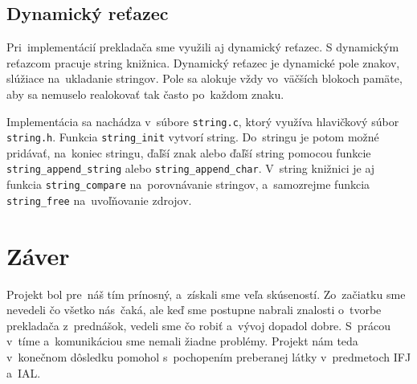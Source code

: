 \documentclass[a4paper, 12pt]{article}[25.11.2020]
\begin{document}
    \subsection{Dynamický reťazec}
        \par Pri~implementácií prekladača sme využili aj dynamický reťazec. S dynamickým
        reťazcom pracuje string knižnica. Dynamický reťazec je dynamické pole znakov, slúžiace
        na~ukladanie stringov. Pole sa alokuje vždy vo~väčších blokoch pamäte, aby sa nemuselo
        realokovať tak často po~každom znaku.
        \par Implementácia sa nachádza v~súbore \verb|string.c|, ktorý využíva hlavičkový 
        súbor \verb|string.h|. Funkcia \verb|string_init| vytvorí string. Do~stringu je potom 
        možné pridávať, na~koniec stringu, ďaľší znak alebo ďaľší string pomocou funkcie 
        \verb|string_append_string| alebo \verb|string_append_char|. V~string knižnici je aj 
        funkcia \verb|string_compare| na~porovnávanie stringov, a~samozrejme funkcia 
        \verb|string_free| na~uvoľňovanie zdrojov.

\section{Záver}
    \par Projekt bol pre~náš tím prínosný, a~získali sme veľa skúseností. Zo~začiatku sme
    nevedeli čo všetko nás~čaká, ale keď sme postupne nabrali znalosti o~tvorbe prekladača 
    z~prednášok, vedeli sme čo robiť a~vývoj dopadol dobre. S~prácou v~tíme a~komunikáciou sme nemali žiadne problémy.
    Projekt nám teda v~konečnom dôsledku pomohol s~pochopením preberanej látky v~predmetoch IFJ a~IAL.
\end{document}
